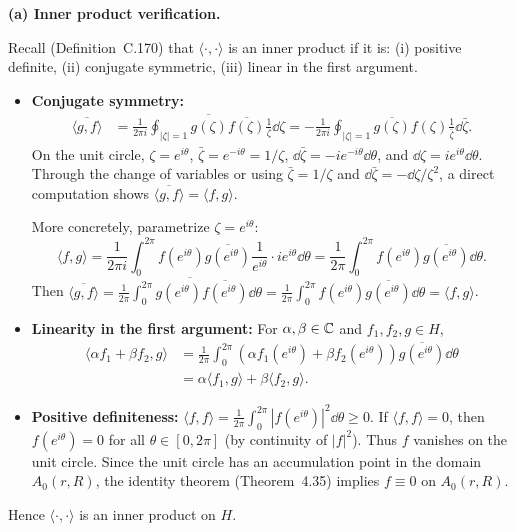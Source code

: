 \documentclass{article}
\begin{document}
\begin{solution}
  \textbf{(a) Inner product verification.}

  Recall (Definition~C.170) that $\langle\cdot,\cdot\rangle$ is an inner
  product if it is: (i) positive definite,
  (ii) conjugate symmetric, (iii) linear in the first argument.

  \begin{itemize}
    \item \textbf{Conjugate symmetry:}
    \begin{align*}
      \overline{\langle g, f \rangle}
      &= \overline{\frac{1}{2\pi i} \oint_{|\zeta|=1}
        g(\zeta) \overline{f(\zeta)} \frac{1}{\zeta} \dd\zeta}
      = -\frac{1}{2\pi i} \oint_{|\zeta|=1}
        \overline{g(\zeta)} f(\zeta) \frac{1}{\bar{\zeta}} \dd\bar{\zeta}.
    \end{align*}
    On the unit circle, $\zeta = e^{i\theta}$, $\bar{\zeta} = e^{-i\theta} = 1/\zeta$,
    $\dd\bar{\zeta} = -ie^{-i\theta} \dd\theta$, and $\dd\zeta = ie^{i\theta} \dd\theta$.
    Through the change of variables or using $\bar{\zeta} = 1/\zeta$ and
    $\dd\bar{\zeta} = -\dd\zeta/\zeta^2$, a direct computation shows
    $\overline{\langle g, f \rangle} = \langle f, g \rangle$.

    More concretely, parametrize $\zeta = e^{i\theta}$:
    \[
      \langle f, g \rangle = \frac{1}{2\pi i} \int_0^{2\pi}
      f(e^{i\theta}) \overline{g(e^{i\theta})} \frac{1}{e^{i\theta}}
      \cdot ie^{i\theta} \dd\theta
      = \frac{1}{2\pi} \int_0^{2\pi}
      f(e^{i\theta}) \overline{g(e^{i\theta})} \dd\theta.
    \]
    Then $\overline{\langle g, f \rangle} = \overline{\frac{1}{2\pi}
    \int_0^{2\pi} g(e^{i\theta}) \overline{f(e^{i\theta})} \dd\theta}
    = \frac{1}{2\pi} \int_0^{2\pi} f(e^{i\theta})
    \overline{g(e^{i\theta})} \dd\theta = \langle f, g \rangle$.

    \item \textbf{Linearity in the first argument:}
    For $\alpha, \beta \in \mathbb{C}$ and $f_1, f_2, g \in H$,
    \begin{align*}
      \langle \alpha f_1 + \beta f_2, g \rangle
      &= \frac{1}{2\pi} \int_0^{2\pi}
      (\alpha f_1(e^{i\theta}) + \beta f_2(e^{i\theta}))
      \overline{g(e^{i\theta})} \dd\theta\\
      &= \alpha \langle f_1, g \rangle + \beta \langle f_2, g \rangle.
    \end{align*}

    \item \textbf{Positive definiteness:}
    $\langle f, f \rangle = \frac{1}{2\pi} \int_0^{2\pi}
    |f(e^{i\theta})|^2 \dd\theta \ge 0$. If $\langle f, f \rangle = 0$,
    then $f(e^{i\theta}) = 0$ for all $\theta \in [0, 2\pi]$ (by continuity
    of $|f|^2$). Thus $f$ vanishes on the unit circle. Since the unit circle
    has an accumulation point in the domain $A_0(r, R)$, the identity theorem
    (Theorem~4.35) implies $f \equiv 0$ on $A_0(r, R)$.
  \end{itemize}
  Hence $\langle\cdot,\cdot\rangle$ is an inner product on $H$.


\end{solution}
\end{document}
